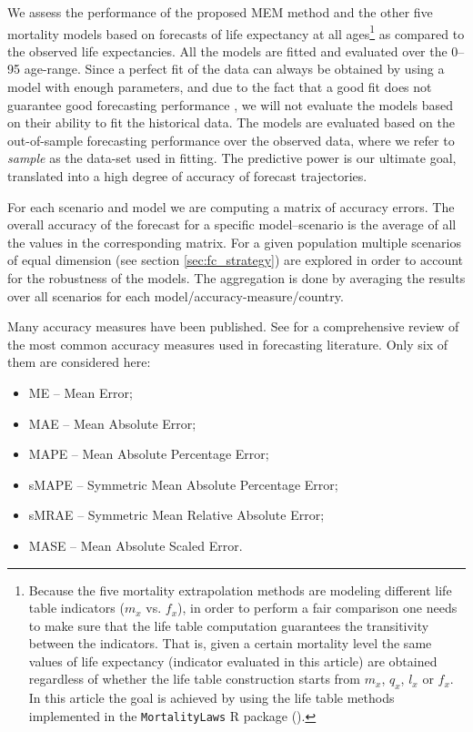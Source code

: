 \documentclass[T0_MEM]{subfiles}
\begin{document}
We assess the performance of the proposed MEM method and the other five mortality models based on forecasts of life expectancy at all ages\footnote{Because the five mortality extrapolation methods are modeling different life table indicators ($m_x$ vs. $f_x$), in order to perform a fair comparison one needs to make sure that the life table computation guarantees the transitivity between the indicators. That is, given a certain mortality level the same values of life expectancy (indicator evaluated in this article) are obtained regardless of whether the life table construction starts from $m_x$, $q_x$, $l_x$ or $f_x$. In this article the goal is achieved by using the life table methods implemented in the \texttt{MortalityLaws} R package (\citeyear{MortalityLaws160}).} as compared to the observed life expectancies. All the models are fitted and evaluated over the 0--95 age-range. Since a perfect fit of the data can always be obtained by using a model with enough parameters, and due to the fact that a good fit does not guarantee good forecasting performance \citep{hyndman2018}, we will not evaluate the models based on their ability to fit the historical data. The models are evaluated based on the out-of-sample forecasting performance over the observed data, where we refer to \emph{sample} as the data-set used in fitting. The predictive power is our ultimate goal, translated into a high degree of accuracy of forecast trajectories.

For each scenario and model we are computing a matrix of accuracy errors. The overall accuracy of the forecast for a specific model--scenario is the average of all the values in the corresponding matrix. For a given population multiple scenarios of equal dimension (see section \ref{sec:fc_strategy}) are explored in order to account for the robustness of the models. The aggregation is done by averaging the results over all scenarios for each model/accuracy-measure/country.

Many accuracy measures have been published. See \cite{hyndman2006} for a comprehensive review of the most common accuracy measures used in forecasting literature. Only six of them are considered here:

\begin{itemize}
  \item ME -- Mean Error;
  \item MAE -- Mean Absolute Error;
  \item MAPE -- Mean Absolute Percentage Error;
  \item sMAPE -- Symmetric Mean Absolute Percentage Error;
  \item sMRAE -- Symmetric Mean Relative Absolute Error;
  \item MASE -- Mean Absolute Scaled Error.
\end{itemize}
\end{document}
